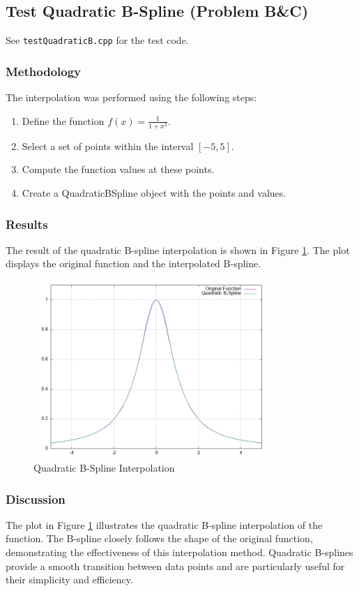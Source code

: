 \documentclass{article}
\begin{document}
\subsection{Test Quadratic B-Spline (Problem B\&C)}
See \texttt{testQuadraticB.cpp} for the test code.
\subsubsection{Methodology}
The interpolation was performed using the following steps:
\begin{enumerate}
    \item Define the function \( f(x) = \frac{1}{1 + x^2} \).
    \item Select a set of points within the interval \([-5, 5]\).
    \item Compute the function values at these points.
    \item Create a QuadraticBSpline object with the points and values.
\end{enumerate}

\subsubsection{Results}
The result of the quadratic B-spline interpolation is shown in Figure \ref{fig:qbspline}. The plot displays the original function and the interpolated B-spline.

\begin{figure}[H]
    \centering
    \includegraphics[width=0.8\textwidth]{../figure/QBspline_plot.png}
    \caption{Quadratic B-Spline Interpolation}
    \label{fig:qbspline}
\end{figure}

\subsubsection{Discussion}
The plot in Figure \ref{fig:qbspline} illustrates the quadratic B-spline interpolation of the function. The B-spline closely follows the shape of the original function, demonstrating the effectiveness of this interpolation method. Quadratic B-splines provide a smooth transition between data points and are particularly useful for their simplicity and efficiency.
\end{document}
